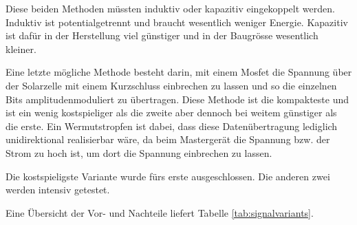 Diese  beiden   Methoden  m\"ussten   induktiv  oder   kapazitiv  eingekoppelt
werden. Induktiv   ist  potentialgetrennt   und  braucht   wesentlich  weniger
Energie. Kapazitiv ist daf\"ur in der  Herstellung viel g\"unstiger und in der
Baugr\"osse wesentlich kleiner.

Eine letzte  m\"ogliche Methode besteht  darin, mit einem Mosfet  die Spannung
\"uber der  Solarzelle mit einem Kurzschluss  einbrechen zu lassen und  so die
einzelnen  Bits amplitudenmoduliert  zu  \"ubertragen. Diese  Methode ist  die
kompakteste und  ist ein wenig kostspieliger  als die zweite aber  dennoch bei
weitem g\"unstiger  als die  erste. Ein Wermutstropfen  ist dabei,  dass diese
Daten\"ubertragung  lediglich  unidirektional  realisierbar  w\"are,  da  beim
Masterger\"at die  Spannung bzw. der Strom  zu hoch ist, um  dort die Spannung
einbrechen zu lassen.

Die  kostspieligste Variante  wurde f\"urs  erste ausgeschlossen. Die  anderen
zwei werden intensiv getestet.

Eine    \"Ubersicht     der    Vor-    und    Nachteile     liefert    Tabelle
\ref{tab:signalvariants}.

